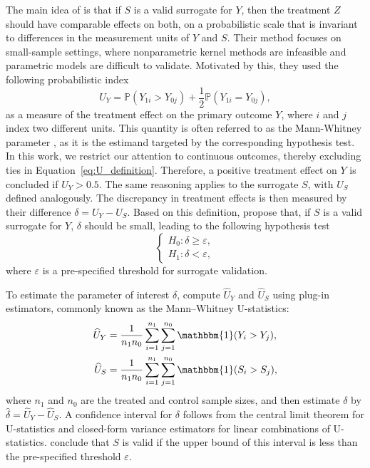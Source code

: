 \documentclass[referee,usenatbib]{biom}
\newcommand{\Prob}{\mathbb{P}}
\newcommand{\one}{\mathbbm{1}}
\begin{document}
The main idea of \citet{parast2024rank} is that if \(S\) is a valid surrogate for \(Y\), then the treatment \(Z\) should have comparable effects on both, on a probabilistic scale that is invariant to differences in the measurement units of \(Y\) and \(S\). Their method focuses on small-sample settings, where nonparametric kernel methods are infeasible and parametric models are difficult to validate. Motivated by this, they used the following probabilistic index
\begin{equation}
  \label{eq:U_definition}
  U_{Y} = \Prob(Y_{1i} > Y_{0j}) + \frac{1}{2} \Prob(Y_{1i} = Y_{0j}),
\end{equation}
as a measure of the treatment effect on the primary outcome \(Y\), where \(i\) and \(j\) index two different units. This quantity is often referred to as the Mann-Whitney parameter \citep{mann1947test, thas2012probabilistic, hoeffding1992class, buyse2010generalized}, as it is the estimand targeted by the corresponding hypothesis test. In this work, we restrict our attention to continuous outcomes, thereby excluding ties in Equation~\eqref{eq:U_definition}. Therefore, a positive treatment effect on \(Y\) is concluded if \(U_{Y} > 0.5\). The same reasoning applies to the surrogate \(S\), with \(U_{S}\) defined analogously. The discrepancy in treatment effects is then measured by their difference \(\delta = U_{Y} - U_{S}\). Based on this definition, \citet{parast2024rank} propose that, if \(S\) is a valid surrogate for \(Y\), \(\delta\) should be small, leading to the following hypothesis test
\begin{equation*}
  \begin{cases}
    H_{0}: \delta \geq \varepsilon, \\
    H_{1}: \delta < \varepsilon,
  \end{cases}
\end{equation*}
where \(\varepsilon\) is a pre-specified threshold for surrogate validation.

To estimate the parameter of interest \(\delta\), \citet{parast2024rank} compute \(\widehat{U}_{Y}\) and \(\widehat{U}_{S}\) using plug-in estimators, commonly known as the Mann--Whitney U-statistics:
\begin{equation*}
  \begin{aligned}
    \widehat{U}_{Y} & = \frac{1}{n_{1} n_{0}} \sum^{n_{1}}_{i = 1} \sum^{n_{0}}_{j = 1} \one(Y_{i} > Y_{j}), \\
    \widehat{U}_{S} & = \frac{1}{n_{1} n_{0}} \sum^{n_{1}}_{i = 1} \sum^{n_{0}}_{j = 1} \one(S_{i} > S_{j}),
  \end{aligned}
\end{equation*}
where \(n_{1}\) and \(n_{0}\) are the treated and control sample sizes, and then estimate \(\delta\) by \(\widehat{\delta} = \widehat{U}_{Y} - \widehat{U}_{S}\). A confidence interval for \(\delta\) follows from the central limit theorem for U-statistics and closed-form variance estimators for linear combinations of U-statistics. \citet{parast2024rank} conclude that \(S\) is valid if the upper bound of this interval is less than the pre-specified threshold \(\varepsilon\).
\end{document}
